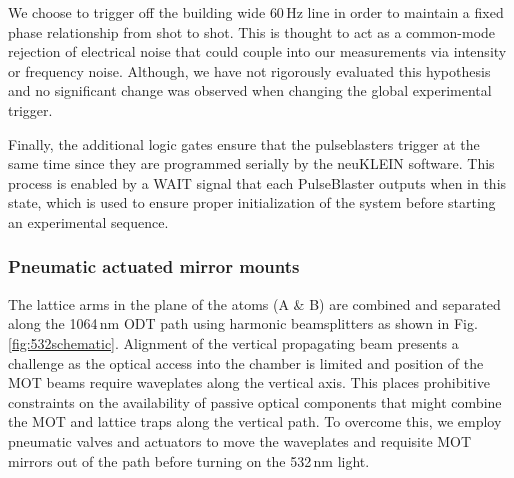 We choose to trigger off the building wide $60$\,Hz line in order to maintain a fixed phase relationship from shot to shot.
This is thought to act as a common-mode rejection of electrical noise that could couple into our measurements via intensity or frequency noise.
Although, we have not rigorously evaluated this hypothesis and no significant change was observed when changing the global experimental trigger.

Finally, the additional logic gates ensure that the pulseblasters trigger at the same time since they are programmed serially by the neuKLEIN software.
This process is enabled by a WAIT signal that each PulseBlaster outputs when in this state, which is used to ensure proper initialization of the system before starting an experimental sequence.

\subsubsection{Pneumatic actuated mirror mounts}
The lattice arms in the plane of the atoms (A \& B) are combined and separated along the 1064\,nm ODT path using harmonic beamsplitters as shown in Fig.\,\ref{fig:532schematic}.
Alignment of the vertical propagating beam presents a challenge as the optical access into the chamber is limited and position of the MOT beams require waveplates along the vertical axis. %
This places prohibitive constraints on the availability of passive optical components that might combine the MOT and lattice traps along the vertical path.
To overcome this, we employ pneumatic valves and actuators to move the waveplates and requisite MOT mirrors out of the path before turning on the 532\,nm light.

